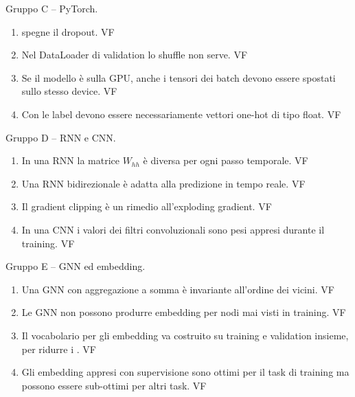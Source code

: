 \begin{domanda}\label{quiz:vfC}
Gruppo C -- PyTorch.
\begin{enumerate}[label=C\arabic*.,nosep,leftmargin=2.6em]
  \item {} spegne il dropout. \hfill V\quad F
  \item Nel DataLoader di validation lo shuffle non serve. \hfill V\quad F
  \item Se il modello è sulla GPU, anche i tensori dei batch devono essere spostati sullo stesso device. \hfill V\quad F
  \item Con  le label devono essere necessariamente vettori one-hot di tipo float. \hfill V\quad F
\end{enumerate}
\end{domanda}

\begin{domanda}\label{quiz:vfD}
Gruppo D -- RNN e CNN.
\begin{enumerate}[label=D\arabic*.,nosep,leftmargin=2.6em]
  \item In una RNN la matrice $W_{hh}$ è diversa per ogni passo temporale. \hfill V\quad F
  \item Una RNN bidirezionale è adatta alla predizione in tempo reale. \hfill V\quad F
  \item Il gradient clipping è un rimedio all'exploding gradient. \hfill V\quad F
  \item In una CNN i valori dei filtri convoluzionali sono pesi appresi durante il training. \hfill V\quad F
\end{enumerate}
\end{domanda}

\begin{domanda}\label{quiz:vfE}
Gruppo E -- GNN ed embedding.
\begin{enumerate}[label=E\arabic*.,nosep,leftmargin=2.6em]
  \item Una GNN con aggregazione a somma è invariante all'ordine dei vicini. \hfill V\quad F
  \item Le GNN non possono produrre embedding per nodi mai visti in training. \hfill V\quad F
  \item Il vocabolario per gli embedding va costruito su training e validation insieme, per ridurre i . \hfill V\quad F
  \item Gli embedding appresi con supervisione sono ottimi per il task di training ma possono essere sub-ottimi per altri task. \hfill V\quad F
\end{enumerate}
\end{domanda}

